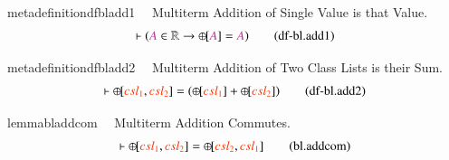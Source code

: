 \begin{restatable}{metadefinition}{dfbladd1}~~ Multiterm Addition of Single Value is
that Value.
\begin{align}
\vdash ( \mc{A} \in \mathbb{R} \rightarrow {\oplus\hspace{-1pt}[} \mc{A} ] =
    \mc{A} )\label{eq:df-bl.add1}\tag{df-bl.add1}
\end{align}
\end{restatable}

\begin{restatable}{metadefinition}{dfbladd2}~~ Multiterm Addition of Two Class Lists
is their Sum.
\begin{align}
\vdash {\oplus\hspace{-1pt}[} \msc{csl_1} , \msc{csl_2} ] = (
    {\oplus\hspace{-1pt}[} \msc{csl_1} ] + {\oplus\hspace{-1pt}[} \msc{csl_2} ]
    )\label{eq:df-bl.add2}\tag{df-bl.add2}
\end{align}
\end{restatable}

\begin{restatable}{lemma}{bladdcom}~~ Multiterm Addition Commutes.
\begin{align}
\vdash {\oplus\hspace{-1pt}[} \msc{csl_1} , \msc{csl_2} ] =
    {\oplus\hspace{-1pt}[} \msc{csl_2} , \msc{csl_1}
    ]\label{eq:bl.addcom}\tag{bl.addcom}
\end{align}
\end{restatable}

